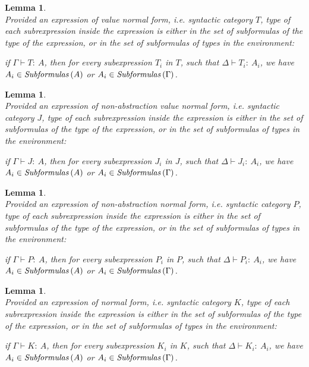 \documentclass[a4paper]{article}
\newcommand{\typecolor}{}
\newcommand{\termcolor}{}
\newcommand{\tp}[1]{{\typecolor #1}}
\newcommand{\tm}[1]{{\termcolor #1}}
\newtheorem{lemma}[theorem]{Lemma}
\newcommand{\typing}[2]{\tm{#1:\ }\tp{#2}}
\newcommand{\txt}[1]{\text{\textit{#1}}}
\newcommand{\subformulas}[1]{\txt{Subformulas}\,(#1)}
\begin{document}
\begin{lemma}\ \\
\label{sub_T}
Provided an expression of value normal form, i.e. syntactic
category $T$, type of each subrexpression inside the expression is
either in the set of subformulas of the type of the expression, or in
the set of subformulas of types in the environment:

 if $\Gamma \vdash \typing{T}{A}$, then for every subexpression $T_i$
 in $T$, such that $\Delta \vdash \typing{T_i}{A_i}$, we have $A_i \in
 \subformulas{A}$ or $A_i \in \subformulas{\Gamma}$. 
\end{lemma}

\begin{lemma}\ \\
\label{sub_J}
Provided an expression of non-abstraction value normal form, i.e. syntactic
category $J$, type of each subrexpression inside the expression is
either in the set of subformulas of the type of the expression, or in
the set of subformulas of types in the environment:

 if $\Gamma \vdash \typing{J}{A}$, then for every subexpression $J_i$
 in $J$, such that $\Delta \vdash \typing{J_i}{A_i}$, we have $A_i \in
 \subformulas{A}$ or $A_i \in \subformulas{\Gamma}$. 
\end{lemma}

\begin{lemma}\ \\
\label{sub_P}
Provided an expression of non-abstraction normal form, i.e. syntactic category $P$,
type of each subrexpression inside the expression is either in the set of
subformulas of the type of the expression, or in the set
of subformulas of types in the environment:

 if $\Gamma \vdash \typing{P}{A}$, then for every subexpression $P_i$
 in $P$, such that $\Delta \vdash \typing{P_i}{A_i}$, we have $A_i \in
 \subformulas{A}$ or $A_i \in \subformulas{\Gamma}$. 
\end{lemma}

\begin{lemma}\ \\
\label{sub_K}
Provided an expression of normal form, i.e. syntactic category $K$,
type of each subrexpression inside the expression is either in the set of
subformulas of the type of the expression, or in the set
of subformulas of types in the environment:

 if $\Gamma \vdash \typing{K}{A}$, then for every subexpression $K_i$
 in $K$, such that $\Delta \vdash \typing{K_i}{A_i}$, we have $A_i \in
 \subformulas{A}$ or $A_i \in \subformulas{\Gamma}$. 
\end{lemma}
 
\end{document}
